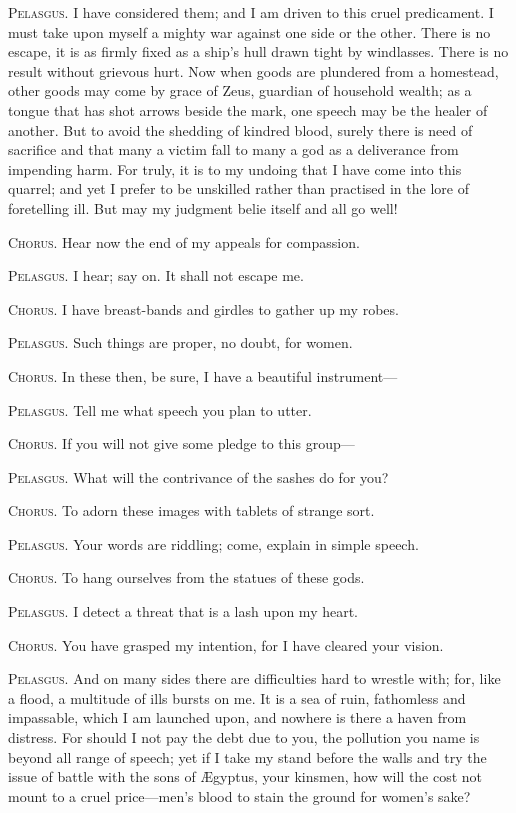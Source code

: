 \documentclass[12pt]{article}
\begin{document}
\textsc{Pelasgus.} I have considered them; and I am driven to this cruel predicament. I must take upon myself a mighty war against one side or the other. There is no escape, it is as firmly fixed as a ship's hull drawn tight by windlasses. There is no result without grievous hurt. Now when goods are plundered from a homestead, other goods may come by grace of Zeus, guardian of household wealth; as a tongue that has shot arrows beside the mark, one speech may be the healer of another. But to avoid the shedding of kindred blood, surely there is need of sacrifice and that many a victim fall to many a god as a deliverance from impending harm. For truly, it is to my undoing that I have come into this quarrel; and yet I prefer to be unskilled rather than practised in the lore of foretelling ill. But may my judgment belie itself and all go well!

\textsc{Chorus.} Hear now the end of my appeals for compassion.

\textsc{Pelasgus.} I hear; say on. It shall not escape me.

\textsc{Chorus.} I have breast-bands and girdles to gather up my robes.

\textsc{Pelasgus.} Such things are proper, no doubt, for women.

\textsc{Chorus.} In these then, be sure, I have a beautiful instrument---

\textsc{Pelasgus.} Tell me what speech you plan to utter.

\textsc{Chorus.} If you will not give some pledge to this group---

\textsc{Pelasgus.} What will the contrivance of the sashes do for you?

\textsc{Chorus.} To adorn these images with tablets of strange sort.

\textsc{Pelasgus.} Your words are riddling; come, explain in simple speech.

\textsc{Chorus.} To hang ourselves from the statues of these gods.

\textsc{Pelasgus.} I detect a threat that is a lash upon my heart.

\textsc{Chorus.} You have grasped my intention, for I have cleared your vision.

\textsc{Pelasgus.} And on many sides there are difficulties hard to wrestle with; for, like a flood, a multitude of ills bursts on me. It is a sea of ruin, fathomless and impassable, which I am launched upon, and nowhere is there a haven from distress. For should I not pay the debt due to you, the pollution you name is beyond all range of speech; yet if I take my stand before the walls and try the issue of battle with the sons of {\AE}gyptus, your kinsmen, how will the cost not mount to a cruel price---men's blood to stain the ground for women's sake?
\end{document}
